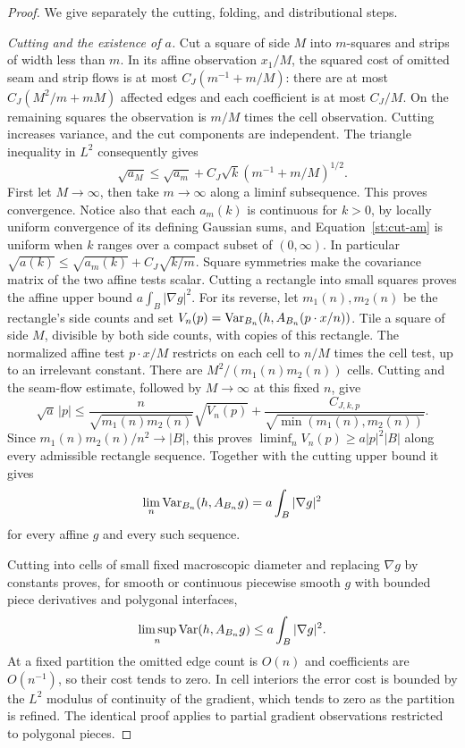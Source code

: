 \begin{proof}
We give separately the cutting, folding, and distributional steps.

\emph{Cutting and the existence of $a$.}
Cut a square of side $M$ into $m$-squares and strips of width less than $m$.
In its affine observation $x_1/M$, the squared cost of omitted seam and
strip flows is at most $C_J(m^{-1}+m/M)$: there are at most
$C_J(M^2/m+mM)$ affected edges and each coefficient is at most $C_J/M$.
On the remaining squares the observation is $m/M$ times the cell
observation. Cutting increases variance, and the cut components are
independent. The triangle inequality in $L^2$ consequently gives
\begin{equation}\label{st:cut-am}
 \sqrt{a_M}\le\sqrt{a_m}+C_J\sqrt{k}(m^{-1}+m/M)^{1/2}.
\end{equation}
First let $M\to\infty$, then take $m\to\infty$ along a liminf subsequence.
This proves convergence. Notice also that each $a_m(k)$ is continuous
for $k>0$, by locally uniform convergence of its defining Gaussian sums,
and Equation~\eqref{st:cut-am} is uniform when $k$ ranges over a compact
subset of $(0,\infty)$. In particular
$\sqrt{a(k)}\le\sqrt{a_m(k)}+C_J\sqrt{k/m}$.
Square symmetries make the covariance matrix of
the two affine tests scalar. Cutting a rectangle into small squares proves
the affine upper bound $a\int_B|\nabla g|^2$. For its reverse, let
$m_1(n),m_2(n)$ be the rectangle's side counts and set
$V_n(p)=\operatorname{Var}_{B_n}(h,A_{B_n}(p\cdot x/n))$. Tile a square of side $M$,
divisible by both side counts, with copies of this rectangle. The
normalized affine test $p\cdot x/M$ restricts on each cell to $n/M$
times the cell test, up to an irrelevant constant. There are
$M^2/(m_1(n)m_2(n))$ cells. Cutting and the seam-flow estimate, followed
by $M\to\infty$ at this fixed $n$, give
\[
 \sqrt a\,|p|
 \le\frac{n}{\sqrt{m_1(n)m_2(n)}}\sqrt{V_n(p)}
       +\frac{C_{J,k,p}}{\sqrt{\min(m_1(n),m_2(n))}}.
\]
Since $m_1(n)m_2(n)/n^2\to|B|$, this proves
$\liminf_nV_n(p)\ge a|p|^2|B|$ along every admissible rectangle sequence.
Together with the cutting upper bound it gives
\[
 \lim_n\operatorname{Var}_{B_n}(h,A_{B_n}g)=a\int_B|\nabla g|^2
\]
for every affine $g$ and every such sequence.

Cutting into cells of small fixed macroscopic diameter and replacing
$\nabla g$ by constants proves, for smooth or continuous piecewise smooth
$g$ with bounded piece derivatives and polygonal interfaces,
\begin{equation}\label{st:upper-energy}
 \limsup_n\operatorname{Var}(h,A_{B_n}g)\le a\int_B|\nabla g|^2.
\end{equation}
At a fixed partition the omitted edge count is $O(n)$ and coefficients
are $O(n^{-1})$, so their cost tends to zero. In cell interiors the error
cost is bounded by the $L^2$ modulus of continuity of the gradient, which
tends to zero as the partition is refined. The identical proof applies to
partial gradient observations restricted to polygonal pieces.


\end{proof}
